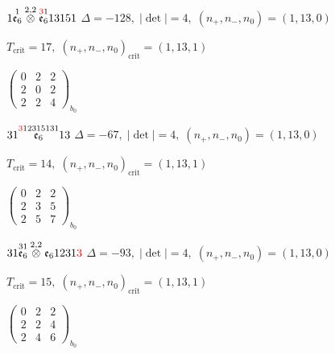 \documentclass[10pt]{article}
\begin{document}
\smallskip

$1\overset{1}{\mathfrak{e}_6}\overset{2,2}{\otimes}\overset{\textcolor{red}{3}1}{\mathfrak{e}_6}13151$ \quad $\Delta=-128,\; |\det|=4,\; (n_+,n_-,n_0)=(1,13,0)$

\hspace{1em}$T_{\text{crit}}=17,\; (n_+,n_-,n_0)_{\text{crit}}=(1,13,1)$

\hspace{2em}$\left(\begin{smallmatrix}0 & 2 & 2 \\ 2 & 0 & 2 \\ 2 & 2 & 4\end{smallmatrix}\right)_{\!b_0}$

\smallskip

$31\overset{\textcolor{red}{3}12315131}{\mathfrak{e}_6}13$ \quad $\Delta=-67,\; |\det|=4,\; (n_+,n_-,n_0)=(1,13,0)$

\hspace{1em}$T_{\text{crit}}=14,\; (n_+,n_-,n_0)_{\text{crit}}=(1,13,1)$

\hspace{2em}$\left(\begin{smallmatrix}0 & 2 & 2 \\ 2 & 3 & 5 \\ 2 & 5 & 7\end{smallmatrix}\right)_{\!b_0}$

\smallskip

$31\overset{31}{\mathfrak{e}_6}\overset{2,2}{\otimes}\mathfrak{e}_61231\textcolor{red}{3}$ \quad $\Delta=-93,\; |\det|=4,\; (n_+,n_-,n_0)=(1,13,0)$

\hspace{1em}$T_{\text{crit}}=15,\; (n_+,n_-,n_0)_{\text{crit}}=(1,13,1)$

\hspace{2em}$\left(\begin{smallmatrix}0 & 2 & 2 \\ 2 & 2 & 4 \\ 2 & 4 & 6\end{smallmatrix}\right)_{\!b_0}$

\smallskip
\end{document}
